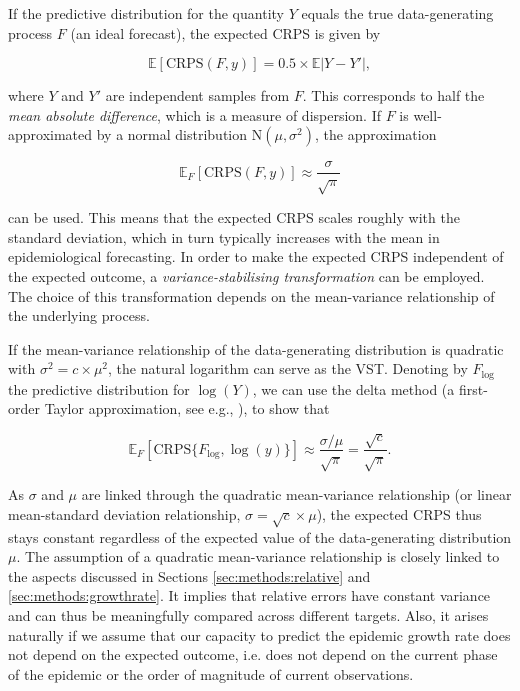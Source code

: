 \documentclass{article}
\begin{document}
If the predictive distribution for the quantity $Y$ equals the true data-generating process $F$ (an ideal forecast), the expected CRPS is given by \citep{gneitingStrictlyProperScoring2007}
\begin{linenomath*}
\begin{equation}
\mathbb{E}[\text{CRPS}(F, y)] = 0.5\times\mathbb{E}|Y - Y'|,
\end{equation}
\end{linenomath*}
where $Y$ and $Y'$ are independent samples from $F$. This corresponds to half the \textit{mean absolute difference}, which is a measure of dispersion. If $F$ is well-approximated by a normal distribution $\text{N}(\mu, \sigma^2)$, the approximation
\begin{linenomath*}
\begin{equation}
\mathbb{E}_F[\text{CRPS}(F, y)] \approx \frac{\sigma}{\sqrt{\pi}}
\end{equation}
\end{linenomath*}
can be used. This means that the expected CRPS scales roughly with the standard deviation, which in turn typically increases with the mean in epidemiological forecasting. In order to make the expected CRPS independent of the expected outcome, a \textit{variance-stabilising transformation} \citep[VST,][]{bartlettSquareRootTransformation1936, dunnGeneralizedLinearModels2018} can be employed. The choice of this transformation depends on the mean-variance relationship of the underlying process. 

If the mean-variance relationship of the data-generating distribution is quadratic with $\sigma^2 = c \times \mu^2$, the natural logarithm can serve as the VST. Denoting by $F_{\log}$ the predictive distribution for $\log(Y)$, we can use the delta method (a first-order Taylor approximation, see e.g., \citealt{dunnGeneralizedLinearModels2018}), to show that

\begin{linenomath*}
\begin{equation}
\mathbb{E}_F[\text{CRPS}\{F_{\log}, \log(y)\}] \approx \frac{\sigma/\mu}{\sqrt{\pi}} 
= \frac{\sqrt{c}}{\sqrt{\pi}}
.\label{eq:taylor_quadratic}
\end{equation}
\end{linenomath*}
As $\sigma$ and $\mu$ are linked through the quadratic mean-variance relationship (or linear mean-standard deviation relationship, $\sigma = \sqrt{c} \times \mu$), the expected CRPS thus stays constant regardless of the expected value of the data-generating distribution $\mu$. The assumption of a quadratic mean-variance relationship is closely linked to the aspects discussed in Sections \ref{sec:methods:relative} and \ref{sec:methods:growthrate}. It implies that relative errors have constant variance and can thus be meaningfully compared across different targets. Also, it arises naturally if we assume that our capacity to predict the epidemic growth rate does not depend on the expected outcome, i.e. does not depend on the current phase of the epidemic or the order of magnitude of current observations.
\end{document}
